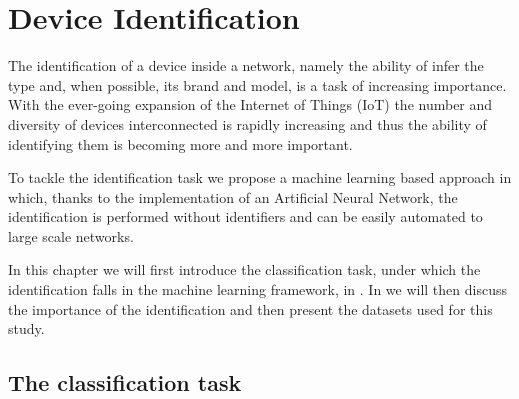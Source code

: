 \chapter{Device Identification}\label{chap3}

The identification of a device inside a network, namely the ability of infer the type
and, when possible, its brand and model, is a task of increasing importance. With the ever-going expansion of the Internet of Things (IoT) the number and diversity of devices interconnected is rapidly increasing and thus the ability of identifying them is becoming more and more important.

To tackle the identification task we propose a machine learning based approach in which, thanks to the implementation of an Artificial Neural Network, the identification is performed without identifiers and can be easily automated to large scale networks. 

In this chapter we will first introduce the classification task, under which the identification falls in the machine learning framework, in . In  we will then discuss the importance of the identification and then present the datasets used for this study.

\section{The classification task}\label{classification}

